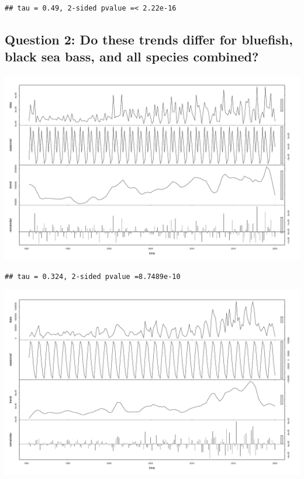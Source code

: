 \documentclass[
  12pt,
]{article}
\begin{document}
\begin{verbatim}
## tau = 0.49, 2-sided pvalue =< 2.22e-16
\end{verbatim}

\hypertarget{question-2-do-these-trends-differ-for-bluefish-black-sea-bass-and-all-species-combined}{%
\subsection{Question 2: Do these trends differ for bluefish, black sea
bass, and all species
combined?}\label{question-2-do-these-trends-differ-for-bluefish-black-sea-bass-and-all-species-combined}}

\includegraphics{Report_FishTrends_files/figure-latex/unnamed-chunk-5-1.pdf}

\begin{verbatim}
## tau = 0.324, 2-sided pvalue =8.7489e-10
\end{verbatim}

\includegraphics{Report_FishTrends_files/figure-latex/unnamed-chunk-7-1.pdf}
\end{document}
